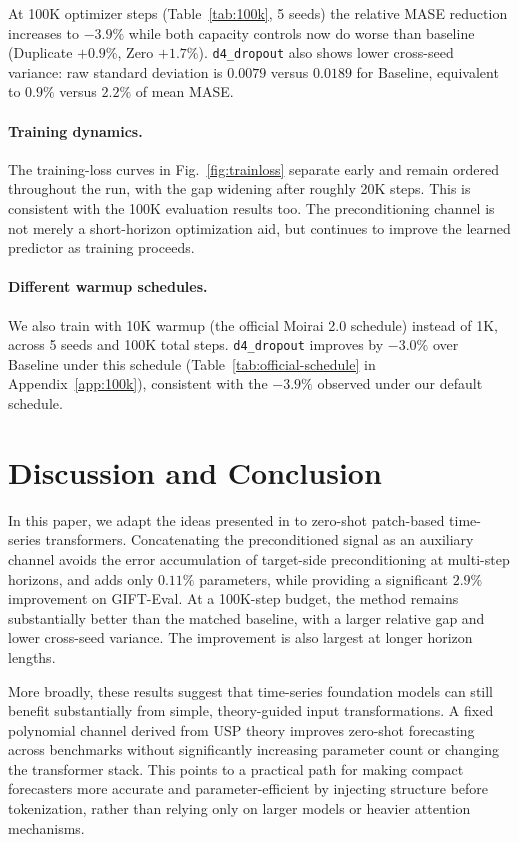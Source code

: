\documentclass{article}
\begin{document}
At 100K optimizer steps (Table~\ref{tab:100k}, 5 seeds) the relative MASE reduction increases to $-3.9\%$ while both capacity controls now do worse than baseline (Duplicate $+0.9\%$, Zero $+1.7\%$). \texttt{d4\_dropout} also shows lower cross-seed variance: raw standard deviation is $0.0079$ versus $0.0189$ for Baseline, equivalent to $0.9\%$ versus $2.2\%$ of mean MASE.

\paragraph{Training dynamics.} The training-loss curves in Fig.~\ref{fig:trainloss} separate early and remain ordered throughout the run, with the gap widening after roughly 20K steps. This is consistent with the 100K evaluation results too. The preconditioning channel is not merely a short-horizon optimization aid, but continues to improve the learned predictor as training proceeds.

\paragraph{Different warmup schedules.} We also train with 10K warmup (the official Moirai 2.0 schedule) instead of 1K, across 5 seeds and 100K total steps. \texttt{d4\_dropout} improves by $-3.0\%$ over Baseline under this schedule (Table~\ref{tab:official-schedule} in Appendix~\ref{app:100k}), consistent with the $-3.9\%$ observed under our default schedule.

\section{Discussion and Conclusion}
In this paper, we adapt the ideas presented in \citet{marsden2024universal} to zero-shot patch-based time-series transformers. Concatenating the preconditioned signal as an auxiliary channel avoids the error accumulation of target-side preconditioning at multi-step horizons, and adds only $0.11\%$ parameters, while providing a significant $2.9\%$ improvement on GIFT-Eval. At a 100K-step budget, the method remains substantially better than the matched baseline, with a larger relative gap and lower cross-seed variance. The improvement is also largest at longer horizon lengths.

More broadly, these results suggest that time-series foundation models can still benefit substantially from simple, theory-guided input transformations. A fixed polynomial channel derived from USP theory improves zero-shot forecasting across benchmarks without significantly increasing parameter count or changing the transformer stack. This points to a practical path for making compact forecasters more accurate and parameter-efficient by injecting structure before tokenization, rather than relying only on larger models or heavier attention mechanisms.
\end{document}
